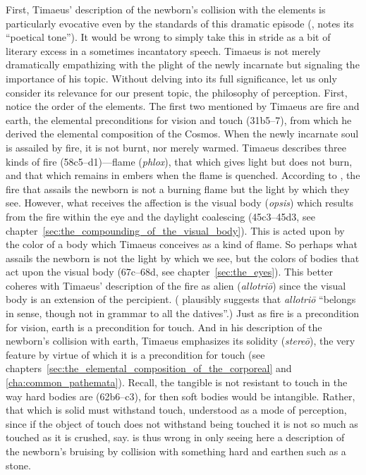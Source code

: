 First, Timaeus' description of the newborn's collision with the elements is particularly evocative even by the standards of this dramatic episode (\citealt[149 n10]{Archer-Hind:1888qd}, notes its ``poetical tone''). It would be wrong to simply take this in stride as a bit of literary excess in a sometimes incantatory speech. Timaeus is not merely dramatically empathizing with the plight of the newly incarnate but signaling the importance of his topic. Without delving into its full significance, let us only consider its relevance for our present topic, the philosophy of perception. First, notice the order of the elements. The first two mentioned by Timaeus are fire and earth, the elemental preconditions for vision and touch (31b5--7), from which he derived the elemental composition of the Cosmos. When the newly incarnate soul is assailed by fire, it is not burnt, nor merely warmed. Timaeus describes three kinds of fire (58c5–d1)---flame (\emph{phlox}), that which gives light but does not burn, and that which remains in embers when the flame is quenched. According to \cite[149 n10]{Archer-Hind:1888qd}, the fire that assails the newborn is not a burning flame but the light by which they see. However, what receives the affection is the visual body (\emph{opsis}) which results from the fire within the eye and the daylight coalescing (45c3–45d3, see chapter~\ref{sec:the_compounding_of_the_visual_body}). This is acted upon by the color of a body which Timaeus conceives as a kind of flame. So perhaps what assails the newborn is not the light by which we see, but the colors of bodies that act upon the visual body (67c–68d, see chapter~\ref{sec:the_eyes}). This better coheres with Timaeus' description of the fire as alien (\emph{allotriō}) since the visual body is an extension of the percipient. (\citealt[269]{Taylor:1928qb} plausibly suggests that \emph{allotriō} ``belongs in sense, though not in grammar to all the datives''.) Just as fire is a precondition for vision, earth is a precondition for touch. And in his description of the newborn's collision with earth, Timaeus emphasizes its solidity (\emph{stereō}), the very feature by virtue of which it is a precondition for touch (see chapters~\ref{sec:the_elemental_composition_of_the_corporeal} and \ref{cha:common_pathemata}). Recall, the tangible is not resistant to touch in the way hard bodies are (62b6–c3), for then soft bodies would be intangible. Rather, that which is solid must withstand touch, understood as a mode of perception, since if the object of touch does not withstand being touched it is not so much as touched as it is crushed, say. \citet[269]{Taylor:1928qb} is thus wrong in only seeing here a description of the newborn's bruising by collision with something hard and earthen such as a stone.

